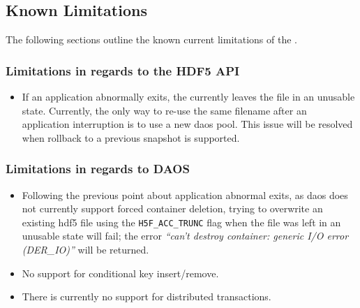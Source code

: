 \documentclass[../users_guide.tex]{subfiles}
\begin{document}
\newpage

\subsection{Known Limitations}

The following sections outline the known current limitations of the \dvc{}.

\subsubsection{Limitations in regards to the HDF5 API}

\begin{itemize}
 \item If an application abnormally exits, the \dvc{} currently leaves the file in an unusable state. Currently, the only way to re-use the same filename after an application interruption is to use a new \acrshort{daos} pool. This issue will be resolved when rollback
to a previous snapshot is supported.
\end{itemize}

\subsubsection{Limitations in regards to DAOS}

\begin{itemize}
 \item Following the previous point about application abnormal exits, as \acrshort{daos} does not currently support forced container deletion, trying to overwrite an existing \acrshort{hdf5} file using the \texttt{H5F\_ACC\_TRUNC} flag when the file was left in an unusable state will fail; the error \textit{``can't destroy container: generic I/O error (DER\_IO)''} will be returned.
\item No support for conditional key insert/remove.
\item There is currently no support for distributed transactions.
\end{itemize}
\end{document}
